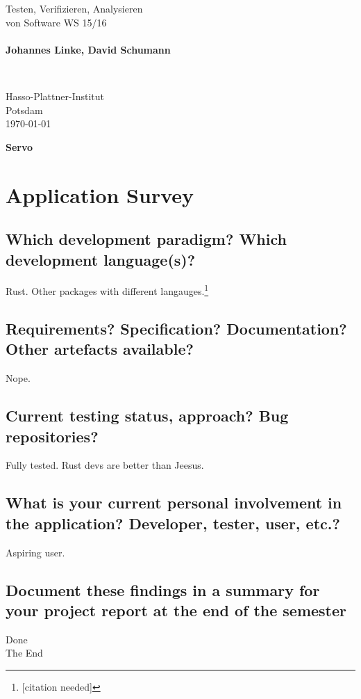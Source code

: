 \documentclass{scrartcl}
\begin{document}
\pagestyle{plain}


\noindent
\begin{minipage}{0.66\textwidth}
Testen, Verifizieren, Analysieren\\
von Software WS 15/16\\
~\\
\textbf{Johannes Linke, David Schumann}
\end{minipage}
~
\begin{minipage}{0.30\textwidth}
Hasso-Plattner-Institut\\
Potsdam\\
\today
\end{minipage}


\begin{center}
 \huge \bf Servo
\end{center}

\section{Application Survey}


\subsection{Which development paradigm? Which development
language(s)?}
Rust. Other packages with different langauges.\footnote{[citation needed]}
\subsection{Requirements? Specification? Documentation? Other artefacts available?}
Nope.
\subsection{Current testing status, approach? Bug repositories?}
Fully tested. Rust devs are better than Jeesus.
\subsection{What is your current personal involvement in the
application? Developer, tester, user, etc.?}
Aspiring user.
\subsection{Document these findings in a summary for your project report at the end of the semester}
Done\\

The End
\end{document}
